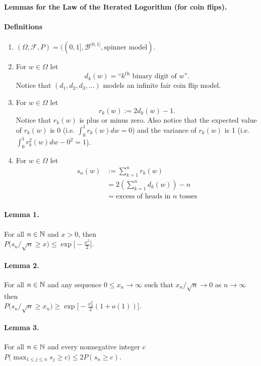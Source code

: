 \documentclass[11pt,letterpaper]{article}
\begin{document}
\begin{center}
\Large \bf
Lemmas for the Law of the Iterated Logorithm (for coin flips).
\end{center}

\paragraph{Definitions}
\begin{enumerate}
\item $(\Omega, \mathcal F, P) = ((0,1], \mathcal B^{(0,1]}, \text{spinner model})$.
\item For $w\in\Omega$ let 
\[d_k(w)= \text{``$k^\text{th}$ binary digit of $w$''}.\] 
Notice that $(d_1,d_2,d_3,\ldots)$ models an infinite fair coin flip model.
\item For $w\in\Omega$ let 
\[r_k(w):= 2d_k(w)- 1. \] 
Notice that $r_k(w)$ is plus or minus zero. Also notice that the expected value of $r_k(w)$ is 0 (i.e. $\int_0^1 r_k(w)dw =0$) and the variance of $r_k(w)$ is 1 (i.e. $\int_0^1 r^2_k(w)dw-0^2 =1$).
\item  For $w\in\Omega$ let
\begin{align*}
s_n(w)&:=\sum_{k=1}^n {r_k(w)}\\
&= 2\left(\sum_{k=1}^n {d_k(w)}\right) -n\\
&= \text{excess of heads in $n$ tosses}
\end{align*}
\end{enumerate}


\paragraph{Lemma 1.}
For all $n\in \Bbb N$ and $x>0$, then \\$ P\bigl(s_n/\sqrt{n} \geq x\bigr)\leq \exp\bigl[ -\frac{x^2}{2} \bigr]$.

\paragraph{Lemma 2.}
For all $n\in \Bbb N$ and any sequence $0\leq x_n \rightarrow \infty$ such that $x_n/\sqrt{n}\rightarrow 0$ as $n\rightarrow \infty$ then \\
$ P\bigl(s_n/\sqrt{n} \geq x_n\bigr)\geq \exp\bigl[ -\frac{x_n^2}{2} (1+o(1))\bigr]$.


\paragraph{Lemma 3.}
For all $n\in\Bbb N$ and every nonnegative integer $c$\\
$ P\bigl( \max_{1\leq j\leq n} s_j \geq c \bigr)\leq 2P(s_n\geq c)$.
\end{document}
